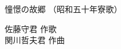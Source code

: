 \documentclass[10pt,b5j]{tarticle} %
\begin{document}
\begin{minipage}[c]{0.7\hsize} %
    \begin{center}
        {\LARGE
            憧憬の故郷 %
        }
        {\small 
            （昭和五十年寮歌） %
        }
    \end{center}
\end{minipage}
\begin{minipage}[c]{0.3\hsize} %
    \begin{flushright} %
        佐藤守君 作歌\\関川哲夫君 作曲 %
    \end{flushright}
\end{minipage}
\end{document}

